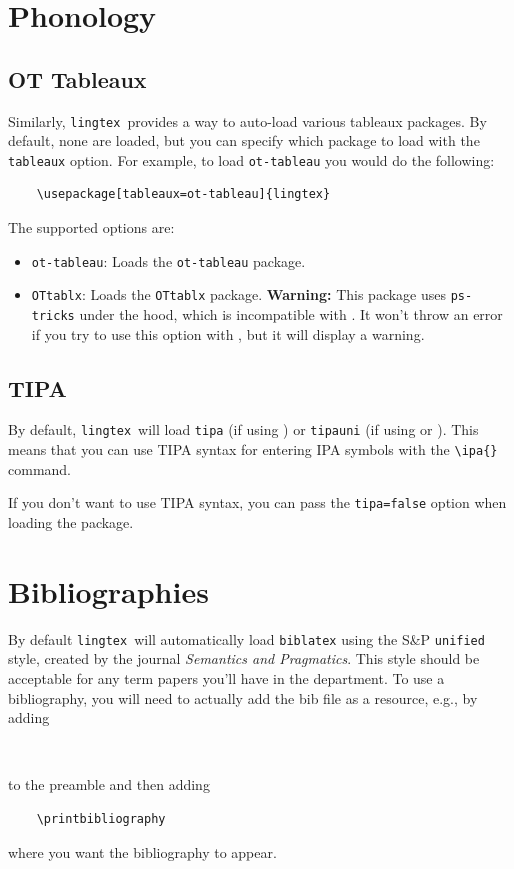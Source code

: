 \documentclass{article}
\def\lingtex{\texttt{lingtex}}
\begin{document}
\section{Phonology} \label{sec:phonology}

\subsection{OT Tableaux} \label{ssec:ot-tableaux}

Similarly, \lingtex\ provides a way to auto-load various tableaux packages. By default, none are loaded, but you can specify which package to load with the \verb|tableaux| option. For example, to load \texttt{ot-tableau} you would do the following:
\begin{verbatim}
    \usepackage[tableaux=ot-tableau]{lingtex}
\end{verbatim}
The supported options are:
\begin{itemize}
	\item \verb|ot-tableau|: Loads the \texttt{ot-tableau} package.
	\item \verb|OTtablx|: Loads the \texttt{OTtablx} package. \textbf{Warning:} This package uses \texttt{ps-tricks} under the hood, which is incompatible with . It won't throw an error if you try to use this option with , but it will display a warning.
\end{itemize}

\subsection{TIPA} \label{ssec:tipa}

By default, \lingtex\ will load \texttt{tipa} (if using ) or \texttt{tipauni} (if using  or ). This means that you can use TIPA syntax for entering IPA symbols with the \verb|\ipa{}| command.

If you don't want to use TIPA syntax, you can pass the \verb|tipa=false| option when loading the package.

\section{Bibliographies} \label{sec:bibliographies}

By default \lingtex\ will automatically load \texttt{biblatex} using the S\&P \verb|unified| style, created by the journal \emph{Semantics and Pragmatics}. This style should be acceptable for any term papers you'll have in the department. To use a bibliography, you will need to actually add the bib file as a resource, e.g., by adding
\begin{verbatim}
    
\end{verbatim}
to the preamble and then adding
\begin{verbatim}
    \printbibliography
\end{verbatim}
where you want the bibliography to appear.
\end{document}
